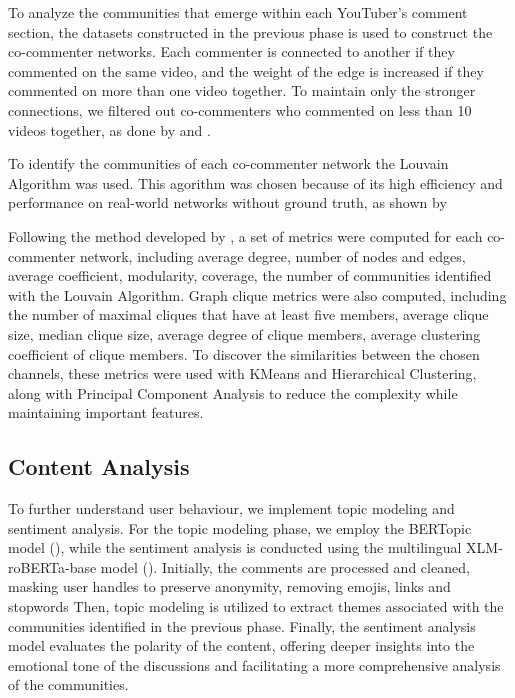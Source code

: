 \documentclass[12pt]{article}
\begin{document}
To analyze the communities that emerge within each YouTuber's comment section, the datasets constructed 
in the previous phase is used to construct the co-commenter networks. Each commenter is connected to
another if they commented on the same video, and the weight of the edge is increased if they commented
on more than one video together. To maintain only the stronger connections, we filtered out co-commenters
who commented on less than 10 videos together, as done by \cite{shajari2023} and \cite{kirdemir2023}. 

To identify the communities of each co-commenter network the Louvain Algorithm was used. This 
agorithm was chosen because of its high efficiency and performance on real-world networks
without ground truth, as shown by \cite{YOU2020104822}

Following the method developed by \cite{kirdemir2023}, a set of metrics were computed 
for each co-commenter network, including average degree, number of nodes and edges, average coefficient,
modularity, coverage, the number of communities identified with the Louvain Algorithm. Graph clique 
metrics were also computed, including the number of maximal cliques that have at least five members, 
average clique size, median clique size, average degree of clique members, average clustering coefficient
of clique members. To discover the similarities between the chosen channels, these metrics were used
with KMeans and Hierarchical Clustering, along with Principal Component Analysis to reduce the complexity
while maintaining important features.

\subsection{Content Analysis}

To further understand user behaviour, we implement
topic modeling and sentiment analysis. For the topic modeling phase, we employ the BERTopic model 
(\cite{bertopic2022}), while the sentiment analysis is conducted using the multilingual 
XLM-roBERTa-base model (\cite{barbieri-etal-2022-xlm}). 
Initially, the comments are processed and cleaned, masking user handles to preserve anonymity,
removing emojis, links and stopwords
Then, topic modeling is utilized to extract themes associated with the communities identified in the 
previous phase. Finally, the sentiment analysis model evaluates the polarity of the content, 
offering deeper insights into the emotional tone of the discussions and facilitating a more 
comprehensive analysis of the communities.
\end{document}
